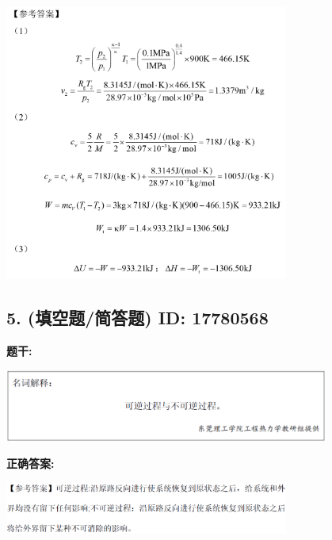 \documentclass[12pt]{article}
\begin{document}
\begin{center}\includegraphics[width=0.7\textwidth, height=0.2\textheight, keepaspectratio]{question_4_17780633/correct_answer_1_img_1.png}\end{center}

\vspace{0.5em}\hrulefill\vspace{1em}

\subsection*{5. (填空题/简答题) \small ID: 17780568}

\textbf{题干:}


\begin{center}\includegraphics[width=0.8\textwidth, height=0.25\textheight, keepaspectratio]{question_5_17780568/title_img_1.png}\end{center}

\textbf{正确答案:}

\begin{center}\includegraphics[width=0.7\textwidth, height=0.2\textheight, keepaspectratio]{question_5_17780568/correct_answer_1_img_1.png}\end{center}
\end{document}
